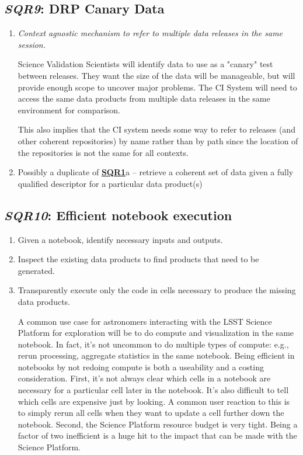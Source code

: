 \documentclass[DM,toc,lsstdraft]{lsstdoc}
\newcommand{\usecase}[3]{%
\subsection{\emph{#1}: #2}
\label{use:#1}
\begin{enumerate}[label=\alph*.]
#3
\end{enumerate}
}
\newcommand{\useref}[1]{\hyperref[use:#1]{\textcolor{lsstblue}{\textbf{#1}}}}
\begin{document}
\usecase{SQR9}{DRP Canary Data}{%

\item
\emph{Context agnostic mechanism to refer to multiple data releases in the same session.}

Science Validation Scientists will identify data to use as a "canary" test between releases. They want the size of the data will be manageable, but will provide enough scope to uncover major problems.
The CI System will need to access the same data products from multiple data releases in the same environment for comparison.

This also implies that the CI system needs some way to refer to releases (and other coherent repositories) by name rather than by path since the location of the repositories is not the same for all contexts.

\item
Possibly a duplicate of \useref{SQR1}a -- retrieve a coherent set of data given a fully qualified descriptor for a particular data product(s)

}

\usecase{SQR10}{Efficient notebook execution}{%

\item
Given a notebook, identify necessary inputs and outputs.

\item
Inspect the existing data products to find products that need to be generated.

\item
Transparently execute only the code in cells necessary to produce the missing data products.

A common use case for astronomers interacting with the LSST Science Platform for exploration will be to do compute and visualization in the same notebook.
In fact, it's not uncommon to do multiple types of compute: e.g., rerun processing, aggregate statistics in the same notebook.
Being efficient in notebooks by not redoing compute is both a useability and a costing consideration.
First, it's not always clear which cells in a notebook are necessary for a particular cell later in the notebook.
It's also difficult to tell which cells are expensive just by looking.
A common user reaction to this is to simply rerun all cells when they want to update a cell further down the notebook.
Second, the Science Platform resource budget is very tight.
Being a factor of two inefficient is a huge hit to the impact that can be made with the Science Platform.

}
\end{document}
